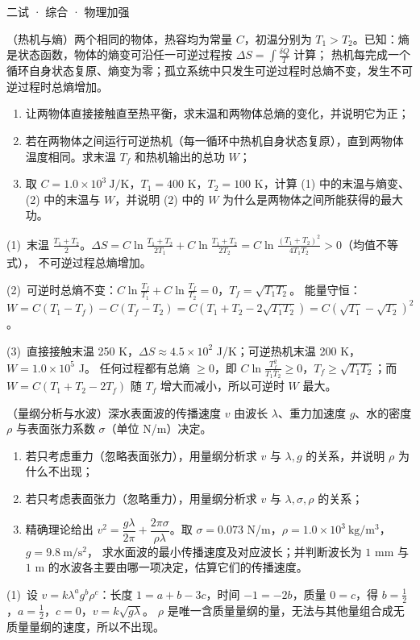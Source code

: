 \documentclass[cjk=noto, seal=first]{mojing-exam}
\begin{document}
\begin{paper}[time={建议 1.5 小时（训练设置）}, full=100]{二试 · 综合 · 物理加强}
\begin{questions}
\question[25]
（热机与熵）两个相同的物体，热容均为常量 $C$，初温分别为 $T_1>T_2$。已知：熵是状态函数，物体的熵变可沿任一可逆过程按 $\Delta S=\displaystyle\int\frac{\delta Q}{T}$ 计算；
热机每完成一个循环自身状态复原、熵变为零；孤立系统中只发生可逆过程时总熵不变，发生不可逆过程时总熵增加。
\begin{enumerate}
  \item 让两物体直接接触直至热平衡，求末温和两物体总熵的变化，并说明它为正；
  \item 若在两物体之间运行可逆热机（每一循环中热机自身状态复原），直到两物体温度相同。求末温 $T_f$ 和热机输出的总功 $W$；
  \item 取 $C=1.0\times10^3\ \mathrm{J/K}$，$T_1=400$ K，$T_2=100$ K，计算 (1) 中的末温与熵变、(2) 中的末温与 $W$，并说明 (2) 中的 $W$ 为什么是两物体之间所能获得的最大功。
\end{enumerate}
\answerspace{2cm}
\begin{solution}
(1)~末温 $\frac{T_1+T_2}2$。$\Delta S=C\ln\frac{T_1+T_2}{2T_1}+C\ln\frac{T_1+T_2}{2T_2}=C\ln\frac{(T_1+T_2)^2}{4T_1T_2}>0$（均值不等式），
不可逆过程总熵增加。

(2)~可逆时总熵不变：$C\ln\frac{T_f}{T_1}+C\ln\frac{T_f}{T_2}=0$，$T_f=\sqrt{T_1T_2}$。
能量守恒：$W=C(T_1-T_f)-C(T_f-T_2)=C(T_1+T_2-2\sqrt{T_1T_2})=C(\sqrt{T_1}-\sqrt{T_2})^2$。

(3)~直接接触末温 250 K，$\Delta S\approx4.5\times10^2$ J/K；可逆热机末温 200 K，$W=1.0\times10^5$ J。
任何过程都有总熵 $\ge0$，即 $C\ln\frac{T_f^2}{T_1T_2}\ge0$，$T_f\ge\sqrt{T_1T_2}$；而 $W=C(T_1+T_2-2T_f)$ 随 $T_f$ 增大而减小，所以可逆时 $W$ 最大。
\end{solution}

\question[25]
（量纲分析与水波）深水表面波的传播速度 $v$ 由波长 $\lambda$、重力加速度 $g$、水的密度 $\rho$ 与表面张力系数 $\sigma$（单位 N/m）决定。
\begin{enumerate}
  \item 若只考虑重力（忽略表面张力），用量纲分析求 $v$ 与 $\lambda,g$ 的关系，并说明 $\rho$ 为什么不出现；
  \item 若只考虑表面张力（忽略重力），用量纲分析求 $v$ 与 $\lambda,\sigma,\rho$ 的关系；
  \item 精确理论给出 $v^2=\dfrac{g\lambda}{2\pi}+\dfrac{2\pi\sigma}{\rho\lambda}$。取 $\sigma=0.073$ N/m，$\rho=1.0\times10^3\ \mathrm{kg/m^3}$，$g=9.8\ \mathrm{m/s^2}$，
        求水面波的最小传播速度及对应波长；并判断波长为 $1$ mm 与 $1$ m 的水波各主要由哪一项决定，估算它们的传播速度。
\end{enumerate}
\answerspace{2cm}
\begin{solution}
(1)~设 $v=k\lambda^ag^b\rho^c$：长度 $1=a+b-3c$，时间 $-1=-2b$，质量 $0=c$，得 $b=\frac12$，$a=\frac12$，$c=0$，$v=k\sqrt{g\lambda}$。
$\rho$ 是唯一含质量量纲的量，无法与其他量组合成无质量量纲的速度，所以不出现。


\end{solution}
\end{questions}
\end{paper}
\end{document}
